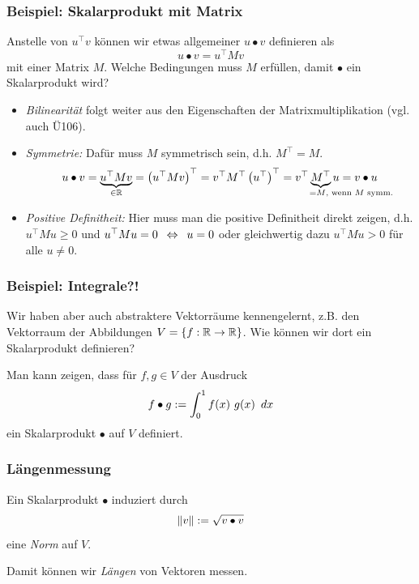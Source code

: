 \documentclass{beamer}
\begin{document}
\begin{frame} \frametitle{Beispiel: Skalarprodukt mit Matrix}
	\justifying \small
	Anstelle von $u^\top v$ können wir etwas allgemeiner $u \bullet v$ definieren als 
	\begin{equation*}
		u \bullet v = u^\top M v
	\end{equation*}
	mit einer Matrix $M$. Welche Bedingungen muss $M$ erfüllen, damit $\bullet$ ein Skalarprodukt wird?
	\begin{itemize}
		\item \emph{Bilinearität} folgt weiter aus den Eigenschaften der Matrixmultiplikation (vgl. auch Ü106).
		\item \emph{Symmetrie:} Dafür muss $M$ symmetrisch sein, d.h. $M^\top = M$. 
		\begin{equation*}
			u \bullet v = \underbrace{u^\top M v}_{\in \R} 
			= \brackets{u^\top M v}^\top 
			= v^\top M^\top \brackets{u^\top}^\top 
			= v^\top \underbrace{M^\top}_{\mathrlap{\hspace{-1em}= M\text{, wenn $M$ symm.}}} u
			= v \bullet u
		\end{equation*}
		\item \emph{Positive Definitheit:} Hier muss man die positive Definitheit direkt zeigen, d.h. $u^\top M u \ge 0$ und $u^\top M u = 0 \enskip \Leftrightarrow \enskip u = 0$ oder gleichwertig dazu $u^\top M u > 0$ für alle $u \neq 0$.
	\end{itemize}
\end{frame}

\begin{frame} \frametitle{Beispiel: Integrale?!}
	Wir haben aber auch abstraktere Vektorräume kennengelernt, z.B. den Vektorraum der Abbildungen $V = \left\{ f : \mathbb{R} \to \mathbb{R} \right\}$. Wie können wir dort ein Skalarprodukt definieren?
	
	Man kann zeigen, dass für $f,g \in V$ der Ausdruck
	\begin{equation*}
		f \bullet g \mathrel{:=} \int_0^1 f(x) \ g(x) \enskip dx
	\end{equation*}
	ein Skalarprodukt $\bullet$ auf $V$ definiert.
\end{frame}

\begin{frame} \frametitle{Längenmessung}
	Ein Skalarprodukt $\bullet$ induziert durch
	\begin{equation*}
		\left\lVert v \right\rVert \mathrel{:=} \sqrt{v \bullet v}
	\end{equation*}
	eine \emph{Norm} auf $V$. 
	
	Damit können wir \emph{Längen} von Vektoren messen.
\end{frame}
\end{document}
